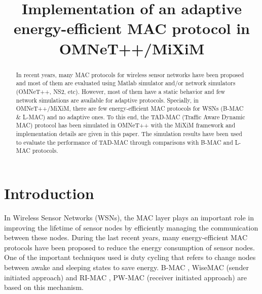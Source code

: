 \documentclass[conference]{IEEEtran}
\begin{document}
\title{Implementation of an adaptive energy-efficient MAC protocol in OMNeT++/MiXiM}

\author{
}

\maketitle

\begin{abstract}
In recent years, many MAC protocols for wireless sensor networks have been proposed and most of them are evaluated using Matlab simulator and/or network simulators (OMNeT++, NS2, etc). However, most of them have a static behavior and few network simulations are available for adaptive protocols. Specially, in OMNeT++/MiXiM, there are few energy-efficient MAC protocols for WSNs (B-MAC \& L-MAC) and no adaptive ones. To this end, the TAD-MAC (Traffic Aware Dynamic MAC) protocol has been simulated in OMNeT++ with the MiXiM framework and implementation details are given in this paper. The simulation results have been used to evaluate the performance of TAD-MAC through comparisons with B-MAC and L-MAC protocols.
\end{abstract}

\IEEEpeerreviewmaketitle

\section{Introduction}
In Wireless Sensor Networks (WSNs), the MAC layer plays an important role in improving the lifetime of sensor nodes by efficiently managing the communication between these nodes. During the last recent years, many energy-efficient MAC protocols have been proposed to reduce the energy consumption of sensor nodes. One of the important techniques used is duty cycling that refers to change nodes between awake and sleeping states to save energy. B-MAC \cite{Polastre:2004:VLP:1031495.1031508}, WiseMAC \cite{El-Hoiydi:2004:WUL:1126253.1129805} (sender initiated approach) and RI-MAC \cite{Sun:2008:RRA:1460412.1460414}, PW-MAC \cite{Tang11pw-mac:an} (receiver initiated approach) are based on this mechanism.
\end{document}
